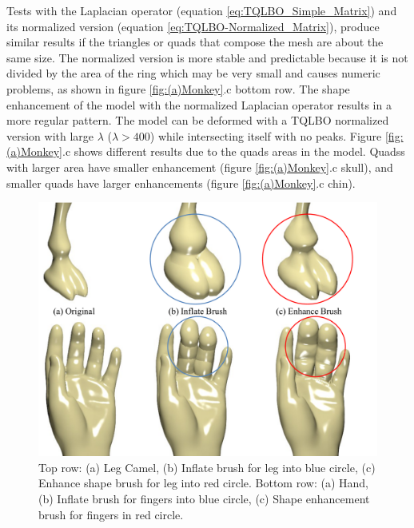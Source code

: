 \documentclass[10pt, conference]{IEEEtran}
\begin{document}
Tests with the Laplacian operator (equation \ref{eq:TQLBO_Simple_Matrix})
and its normalized version (equation \ref{eq:TQLBO-Normalized_Matrix}),
produce similar results if the triangles or quads that compose the
mesh are about the same size. The normalized version is more stable
and predictable because it is not divided by the area of the ring
which may be very small and causes numeric problems, as shown in figure
\ref{fig:(a)Monkey}.c bottom row. The shape enhancement of the model
with the normalized Laplacian operator results in a more regular pattern.
The model can be deformed with a TQLBO normalized version with large
$\lambda$ ($\lambda>400$) while intersecting itself with no peaks.
Figure \ref{fig:(a)Monkey}.c shows different results due to the quads
areas in the model. Quadss with larger area have smaller enhancement
(figure \ref{fig:(a)Monkey}.c skull), and smaller quads have larger
enhancements (figure \ref{fig:(a)Monkey}.c chin).

\begin{figure}
\includegraphics[width=1\columnwidth]{figs/sculpt_brush}

\caption{\label{fig:Sculpt_Brush}Top row: (a) Leg Camel, (b) Inflate brush
for leg into blue circle, (c) Enhance shape brush for leg into red
circle. Bottom row: (a) Hand, (b) Inflate brush for fingers into blue
circle, (c) Shape enhancement brush for fingers in red circle.}
\end{figure}
\end{document}
